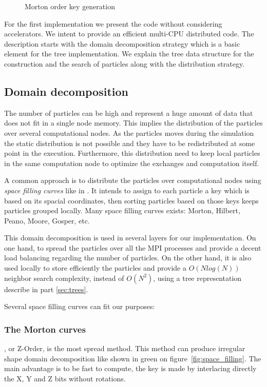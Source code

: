 \begin{figure}[t!]
\centering

\caption{Morton order key generation}
\end{figure}

For the first implementation we present the code without considering accelerators. 
We intent to provide an efficient multi-CPU distributed code. 
The description starts with the domain decomposition strategy which is a basic element for the tree implementation.
We explain the tree data structure for the construction and the search of particles along with the distribution strategy.

\subsection{Domain decomposition}
\label{sec:domain_decomposition}
The number of particles can be high and represent a huge amount of data that does not fit in a single node memory. 
This implies the distribution of the particles over several computational nodes. 
As the particles moves during the simulation the static distribution is not possible and they have to be redistributed at some point in the execution. 
Furthermore, this distribution need to keep local particles in the same computation node to optimize the exchanges and computation itself.

A common approach is to distribute the particles over computational nodes using \textit{space filling curves} like in \cite{warren20132hot,springel2005cosmological,bedorf201424}. 
It intends to assign to each particle a key which is based on its spacial coordinates, then sorting particles based on those keys keeps particles grouped locally.
Many space filling curves exists: Morton, Hilbert, Peano, Moore, Gosper, etc.\

This domain decomposition is used in several layers for our implementation. 
On one hand, to spread the particles over all the MPI processes and provide a decent load balancing regarding the number of particles. 
On the other hand, it is also used locally to store efficiently the particles and provide a $O(N log(N))$ neighbor search complexity, instead of $O(N^2)$, using a tree representation describe in part \ref{sec:trees}. 

Several space filling curves can fit our purposes:
\subsubsection*{The Morton curves} \cite{morton1966computer}, or Z-Order, is the most spread method. 
This method can produce irregular shape domain decomposition like shown in green on figure~\ref{fig:space_filling}. 
The main advantage is to be fast to compute, the key is made by interlacing directly the X, Y and Z bits without rotations. 
